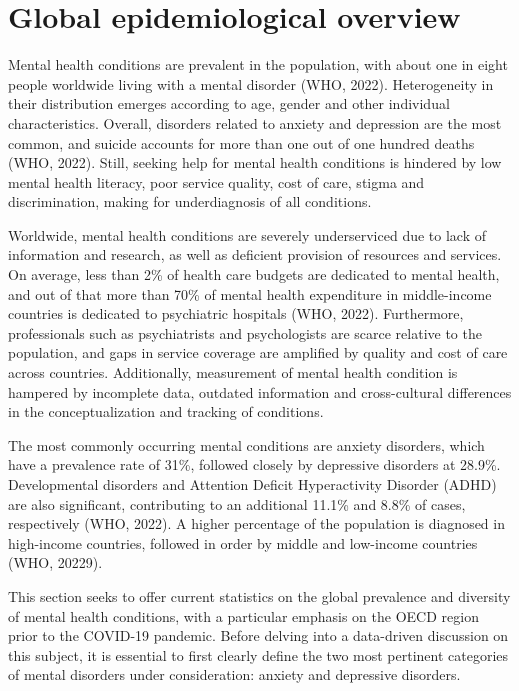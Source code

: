 \section{Global epidemiological overview}
    Mental health conditions are prevalent in the population, with about one in eight people worldwide living with a mental disorder (WHO, 2022). Heterogeneity in their distribution emerges according to age, gender and other individual characteristics. Overall, disorders related to anxiety and depression are the most common, and suicide accounts for more than one out of one hundred deaths (WHO, 2022). 
    Still, seeking help for mental health conditions is hindered by low mental health literacy, poor service quality, cost of care, stigma and discrimination, making for underdiagnosis of all conditions. 

    Worldwide, mental health conditions are severely underserviced due to lack of information and research, as well as deficient provision of resources and services. On average, less than 2\% of health care budgets are dedicated to mental health, and out of that more than 70\% of mental health expenditure in middle-income countries is dedicated to psychiatric hospitals (WHO, 2022). 
    Furthermore, professionals such as psychiatrists and psychologists are scarce relative to the population, and gaps in service coverage are amplified by quality and cost of care across countries. 
    Additionally, measurement of mental health condition is hampered by incomplete data, outdated information and cross-cultural differences in the conceptualization and tracking of conditions. 

    The most commonly occurring mental conditions are anxiety disorders, which have a prevalence rate of 31\%, followed closely by depressive disorders at 28.9\%. Developmental disorders and Attention Deficit Hyperactivity Disorder (ADHD) are also significant, contributing to an additional 11.1\% and 8.8\% of cases, respectively (WHO, 2022).
    A higher percentage of the population is diagnosed in high-income countries, followed in order by middle and low-income countries (WHO, 20229). 

    This section seeks to offer current statistics on the global prevalence and diversity of mental health conditions, with a particular emphasis on the OECD region prior to the COVID-19 pandemic. Before delving into a data-driven discussion on this subject, it is essential to first clearly define the two most pertinent categories of mental disorders under consideration: anxiety and depressive disorders. 


